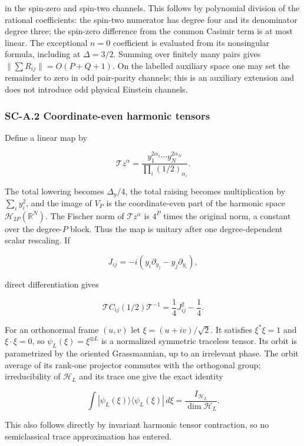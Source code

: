 in the spin-zero and spin-two channels. This follows by polynomial division of the rational coefficients: the spin-two numerator has degree four and its denominator degree three; the spin-zero difference from the common Casimir term is at most linear. The exceptional \(n=0\) coefficient is evaluated from its nonsingular formula, including at \(\Delta=3/2\). Summing over finitely many pairs gives \(\|\sum R_{ij}\|=O(P+Q+1)\). On the labelled auxiliary space one may set the remainder to zero in odd pair-parity channels; this is an auxiliary extension and does not introduce odd physical Einstein channels.

\hypertarget{sc-a.2-coordinate-even-harmonic-tensors}{%
\subsubsection{SC-A.2 Coordinate-even harmonic tensors}\label{sc-a.2-coordinate-even-harmonic-tensors}}

Define a linear map by

\[
\mathcal T z^\alpha=\frac{y_1^{2\alpha_1}\cdots y_N^{2\alpha_N}}
{\prod_i(1/2)_{\alpha_i}}.
\]

The total lowering becomes \(\Delta_y/4\), the total raising becomes multiplication by \(\sum_i y_i^2\), and the image of \(V_P\) is the coordinate-even part of the harmonic space \(\mathcal H_{2P}(\mathbb R^N)\). The Fischer norm of \(\mathcal Tz^\alpha\) is \(4^P\) times the original norm, a constant over the degree-\(P\) block. Thus the map is unitary after one degree-dependent scalar rescaling. If

\[
J_{ij}=-i(y_i\partial_{y_j}-y_j\partial_{y_i}),
\]

direct differentiation gives

\[
\mathcal T C_{ij}(1/2)\mathcal T^{-1}
=\frac14J_{ij}^2-\frac14.
\]

For an orthonormal frame \((u,v)\) let \(\xi=(u+iv)/\sqrt2\). It satisfies \(\xi^*\xi=1\) and \(\xi\cdot\xi=0\), so \(\psi_L(\xi)=\xi^{\otimes L}\) is a normalized symmetric traceless tensor. Its orbit is parametrized by the oriented Grassmannian, up to an irrelevant phase. The orbit average of its rank-one projector commutes with the orthogonal group; irreducibility of \(\mathcal H_L\) and its trace one give the exact identity

\[
\int |\psi_L(\xi)\rangle\langle\psi_L(\xi)|\,d\xi
=\frac{I_{\mathcal H_L}}{\dim\mathcal H_L}.
\]

This also follows directly by invariant harmonic tensor contraction, so no semiclassical trace approximation has entered.


